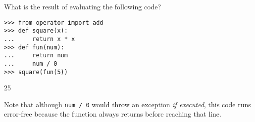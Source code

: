 
\begin{blocksection}
\question
What is the result of evaluating the following code?

\begin{lstlisting}
>>> from operator import add
>>> def square(x):
...     return x * x
>>> def fun(num):
...     return num
...     num / 0
>>> square(fun(5))
\end{lstlisting}
\begin{solution}[0.5in]
25

Note that although \texttt{num / 0} would throw an exception
\textit{if executed}, this code runs error-free because the function always
returns before reaching that line.
\end{solution}
\end{blocksection}
